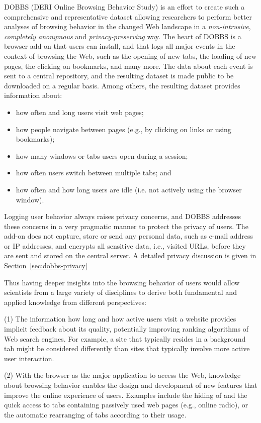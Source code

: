 \documentclass[11pt,fleqn,twoside]{article}
\begin{document}
DOBBS (DERI Online Browsing Behavior Study) is an effort to create such a comprehensive and representative dataset allowing researchers to perform better analyses of browsing behavior in the changed Web landscape in a \textit{non-intrusive}, \textit{completely anonymous} and \textit{privacy-preserving} way. The heart of DOBBS is a browser add-on that users can install, and that logs all major events in the context of browsing the Web, such as the opening of new tabs, the loading of new pages, the clicking on bookmarks, and many more. The data about each event is sent to a central repository, and the resulting dataset is made public to be downloaded on a regular basis. Among others, the resulting dataset provides information about:
\begin{itemize} 
 \item how often and long users visit web pages;
 \item how people navigate between pages (e.g., by clicking on links or using bookmarks);
 \item how many windows or tabs users open during a session;
 \item how often users switch between multiple tabs; and
 \item how often and how long users are idle (i.e. not actively using the browser window).
\end{itemize}
Logging user behavior always raises privacy concerns, and DOBBS addresses these concerns in a very pragmatic manner to protect the privacy of users. The add-on does not capture, store or send any personal data, such as e-mail address or IP addresses, and encrypts all sensitive data, i.e., visited URLs, before they are sent and stored on the central server. A detailed privacy discussion is given in Section~\ref{sec:dobbs-privacy}

Thus having deeper insights into the browsing behavior of users would allow scientists from a large variety of disciplines to derive both fundamental and applied knowledge from different perspectives:

(1) The information how long and how active users visit a website provides implicit feedback about its quality, potentially improving ranking algorithms of Web search engines. For example, a site that typically resides in a background tab might be considered differently than sites that typically involve more active user interaction.

(2) With the browser as the major application to access the Web, knowledge about browsing behavior enables the design and development of new features that improve the online experience of users. Examples include the hiding of and the quick access to tabs containing passively used web pages (e.g., online radio), or the automatic rearranging of tabs according to their usage.
\end{document}
